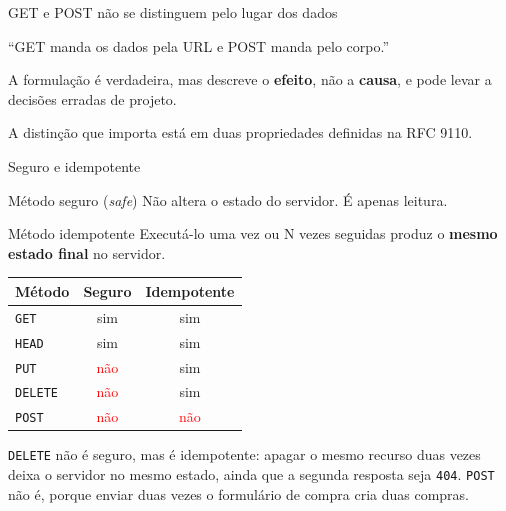 \documentclass{beamer}
\newcommand{\tcr}[1]{\textcolor{red}{#1}}
\newcommand{\tcg}[1]{\textcolor{green!50!black}{#1}}
\begin{document}
\begin{frame}{GET e POST não se distinguem pelo lugar dos dados}
  \begin{center}
    \large ``GET manda os dados pela URL e POST manda pelo corpo.''
  \end{center}

  \vspace{0.4cm}
  A formulação é verdadeira, mas descreve o \textbf{efeito}, não a
  \textbf{causa}, e pode levar a decisões erradas de projeto.

  \vspace{0.4cm}
  A distinção que importa está em duas propriedades definidas na RFC 9110.
\end{frame}

\begin{frame}{Seguro e idempotente}
  \begin{block}{Método seguro (\textit{safe})}
    Não altera o estado do servidor. É apenas leitura.
  \end{block}

  \begin{block}{Método idempotente}
    Executá-lo uma vez ou N vezes seguidas produz o \textbf{mesmo estado final}
    no servidor.
  \end{block}

  \begin{center}
    \small
    \begin{tabular}{@{}lcc@{}}
      \toprule
      \textbf{Método} & \textbf{Seguro} & \textbf{Idempotente} \\
      \midrule
      \texttt{GET}    & \tcg{sim} & \tcg{sim} \\
      \texttt{HEAD}   & \tcg{sim} & \tcg{sim} \\
      \texttt{PUT}    & \tcr{não} & \tcg{sim} \\
      \texttt{DELETE} & \tcr{não} & \tcg{sim} \\
      \texttt{POST}   & \tcr{não} & \tcr{não} \\
      \bottomrule
    \end{tabular}
  \end{center}

  \vspace{0.2cm}
  \footnotesize
  \texttt{DELETE} não é seguro, mas é idempotente: apagar o mesmo recurso duas
  vezes deixa o servidor no mesmo estado, ainda que a segunda resposta seja
  \texttt{404}. \texttt{POST} não é, porque enviar duas vezes o formulário de
  compra cria duas compras.
\end{frame}
\end{document}
